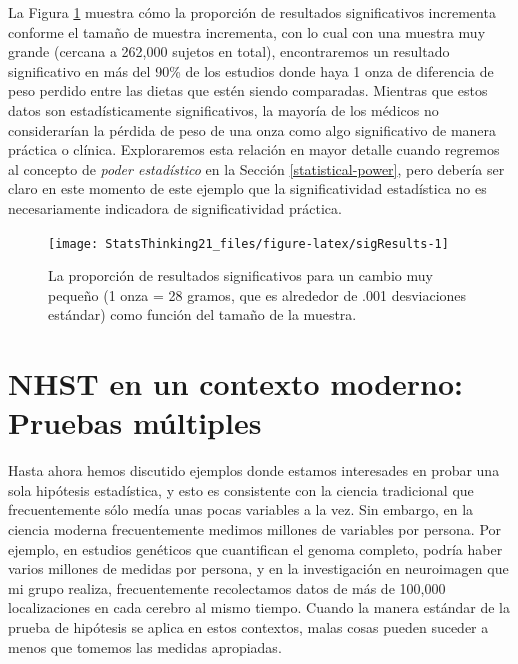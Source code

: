 \documentclass[
  12pt,
]{book}
\begin{document}
La Figura \ref{fig:sigResults} muestra cómo la proporción de resultados significativos incrementa conforme el tamaño de muestra incrementa, con lo cual con una muestra muy grande (cercana a 262,000 sujetos en total), encontraremos un resultado significativo en más del 90\% de los estudios donde haya 1 onza de diferencia de peso perdido entre las dietas que estén siendo comparadas. Mientras que estos datos son estadísticamente significativos, la mayoría de los médicos no considerarían la pérdida de peso de una onza como algo significativo de manera práctica o clínica. Exploraremos esta relación en mayor detalle cuando regremos al concepto de \emph{poder estadístico} en la Sección \ref{statistical-power}, pero debería ser claro en este momento de este ejemplo que la significatividad estadística no es necesariamente indicadora de significatividad práctica.

\begin{figure}
\texttt{[image: StatsThinking21\_files/figure-latex/sigResults-1]} \caption{La proporción de resultados significativos para un cambio muy pequeño (1 onza = 28 gramos, que es alrededor de .001 desviaciones estándar) como función del tamaño de la muestra.}\label{fig:sigResults}
\end{figure}

\hypertarget{nhst-en-un-contexto-moderno-pruebas-muxfaltiples}{%
\section{NHST en un contexto moderno: Pruebas múltiples}\label{nhst-en-un-contexto-moderno-pruebas-muxfaltiples}}

Hasta ahora hemos discutido ejemplos donde estamos interesades en probar una sola hipótesis estadística, y esto es consistente con la ciencia tradicional que frecuentemente sólo medía unas pocas variables a la vez. Sin embargo, en la ciencia moderna frecuentemente medimos millones de variables por persona. Por ejemplo, en estudios genéticos que cuantifican el genoma completo, podría haber varios millones de medidas por persona, y en la investigación en neuroimagen que mi grupo realiza, frecuentemente recolectamos datos de más de 100,000 localizaciones en cada cerebro al mismo tiempo. Cuando la manera estándar de la prueba de hipótesis se aplica en estos contextos, malas cosas pueden suceder a menos que tomemos las medidas apropiadas.
\end{document}
